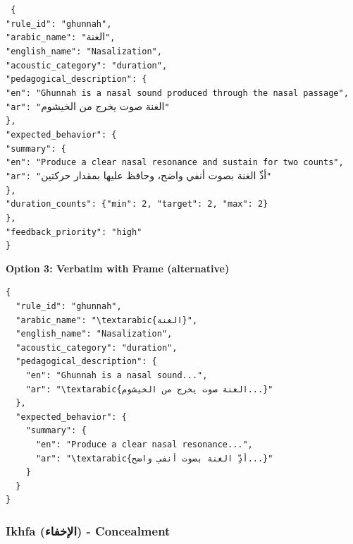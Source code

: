 \noindent
\texttt{
\{\\
\quad "rule\_id": "ghunnah",\\
\quad "arabic\_name": "}\textarabic{الغنة}\texttt{",\\
\quad "english\_name": "Nasalization",\\
\quad "acoustic\_category": "duration",\\
\quad "pedagogical\_description": \{\\
\quad\quad "en": "Ghunnah is a nasal sound produced through the nasal passage",\\
\quad\quad "ar": "}\textarabic{الغنة صوت يخرج من الخيشوم}\texttt{"\\
\quad \},\\
\quad "expected\_behavior": \{\\
\quad\quad "summary": \{\\
\quad\quad\quad "en": "Produce a clear nasal resonance and sustain for two counts",\\
\quad\quad\quad "ar": "}\textarabic{أدِّ الغنة بصوت أنفي واضح، وحافظ عليها بمقدار حركتين}\texttt{"\\
\quad\quad \},\\
\quad\quad "duration\_counts": \{"min": 2, "target": 2, "max": 2\}\\
\quad \},\\
\quad "feedback\_priority": "high"\\
\}
}

\bigskip

\textbf{Option 3: Verbatim with Frame (alternative)}

\begin{Verbatim}[frame=single, framesep=3mm, fontfamily=tt, fontsize=\small]
{
  "rule_id": "ghunnah",
  "arabic_name": "\textarabic{الغنة}",
  "english_name": "Nasalization",
  "acoustic_category": "duration",
  "pedagogical_description": {
    "en": "Ghunnah is a nasal sound...",
    "ar": "\textarabic{الغنة صوت يخرج من الخيشوم...}"
  },
  "expected_behavior": {
    "summary": {
      "en": "Produce a clear nasal resonance...",
      "ar": "\textarabic{أدِّ الغنة بصوت أنفي واضح...}"
    }
  }
}
\end{Verbatim}

\subsubsection{Ikhfa (الإخفاء) - Concealment}

